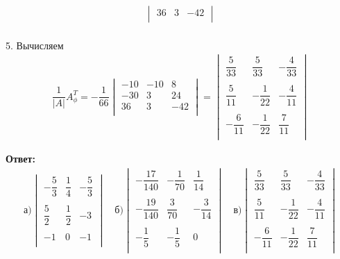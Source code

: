 \begin{enumerate}
\begin{gather*}
\begin{vmatrix}
					36 & 3 & -42\\
				\end{vmatrix}
			\end{gather*}
			\\
			5. Вычисляем 
			\begin{gather*}
				\dfrac{1}{|A|} A_{\phi}^{T} = -\dfrac{1}{66} 
				\begin{vmatrix}
					-10 & -10 & 8\\
					-30 & 3 & 24\\
					36 & 3 & -42\\
				\end{vmatrix}
				=
				\begin{vmatrix}
					\dfrac{5}{33} & \dfrac{5}{33} & -\dfrac{4}{33}\\
					\\
					\dfrac{5}{11} & -\dfrac{1}{22} & -\dfrac{4}{11}\\
					\\
					-\dfrac{6}{11} & -\dfrac{1}{22} & \dfrac{7}{11}\\
				\end{vmatrix}
			\end{gather*}
		\end{enumerate}
	
		\textbf{Ответ:}\\
		\begin{gather*}
			\text{а)}
			\begin{vmatrix}
				-\dfrac{5}{3} & \dfrac{1}{4} & -\dfrac{5}{3}\\
				\\
				\dfrac{5}{2} & \dfrac{1}{2} & -3\\
				\\
				-1 & 0 & -1\\
			\end{vmatrix}
			\quad
			\text{б)}
			\begin{vmatrix}
				-\dfrac{17}{140} & -\dfrac{1}{70} & \dfrac{1}{14}\\
				\\
				-\dfrac{19}{140} & \dfrac{3}{70} & -\dfrac{3}{14}\\
				\\
				-\dfrac{1}{5} & -\dfrac{1}{5} & 0\\
			\end{vmatrix}
			\quad
			\text{в)}
			\begin{vmatrix}
				\dfrac{5}{33} & \dfrac{5}{33} & -\dfrac{4}{33}\\
				\\
				\dfrac{5}{11} & -\dfrac{1}{22} & -\dfrac{4}{11}\\
				\\
				-\dfrac{6}{11} & -\dfrac{1}{22} & \dfrac{7}{11}\\
			\end{vmatrix}
		\end{gather*}
		
